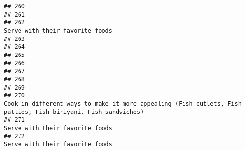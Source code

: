 \documentclass[
]{article}
\begin{document}
\begin{verbatim}
## 260                                                                                                                                                                                                             
## 261                                                                                                                                                                                                             
## 262                                                                                                                                                                              Serve with their favorite foods
## 263                                                                                                                                                                                                             
## 264                                                                                                                                                                                                             
## 265                                                                                                                                                                                                             
## 266                                                                                                                                                                                                             
## 267                                                                                                                                                                                                             
## 268                                                                                                                                                                                                             
## 269                                                                                                                                                                                                             
## 270                                                                                                Cook in different ways to make it more appealing (Fish cutlets, Fish patties, Fish biriyani, Fish sandwiches)
## 271                                                                                                                                                                              Serve with their favorite foods
## 272                                                                                                                                                                              Serve with their favorite foods

\end{verbatim}
\end{document}
